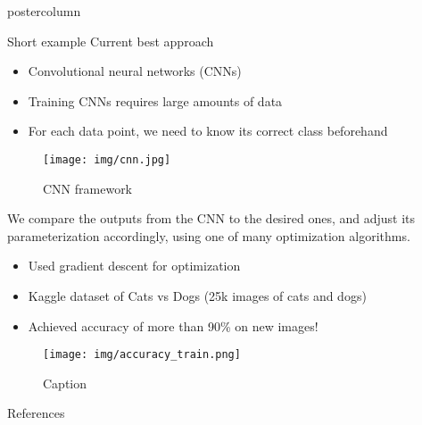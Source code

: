 \documentclass{beamer}
\begin{document}
\begin{frame}
\begin{columns}
\begin{column}{.57\textwidth}
\begin{beamercolorbox}[center]{postercolumn}
\begin{minipage}{.98\textwidth}
{\begin{myblock}{Short example}
					    \vspace{0.8cm}
					    Current best approach
					    \vspace{0.8cm}
					    \begin{itemize}
					        \item Convolutional neural networks (CNNs)
					        \item Training CNNs requires large amounts of data
					        \item For each data point, we need to know its correct class beforehand
					    \end{itemize}
					    
					    \vspace{0.8cm}
					    \begin{figure}
					        \centering
					        \texttt{[image: img/cnn.jpg]}
					        \caption{CNN framework}
					        \label{fig:my_label}
					    \end{figure}
					    
					    We compare the outputs from the CNN to the desired ones, and adjust its parameterization accordingly, using one of many optimization algorithms.
					    \vspace{0.8cm}
					    \begin{itemize}
					        \item Used gradient descent\cite{Paivi} for optimization
					        \item Kaggle dataset of Cats vs Dogs \cite{Oegren2008} (25k images of cats and dogs)
					        \item Achieved accuracy of more than 90\% on new images!
					    \end{itemize}
					    					    
					    \begin{figure}
					        \centering
					        \texttt{[image: img/accuracy\_train.png]}
					        \caption{Caption}
					        \label{fig:my_label}
					    \end{figure}
					    
					\end{myblock}
					\begin{myblock}{References}
						\footnotesize
						
						
					\end{myblock}\vfill
		}\end{minipage}\end{beamercolorbox}
	\end{column}
\end{columns}
\end{frame}
\end{document}
